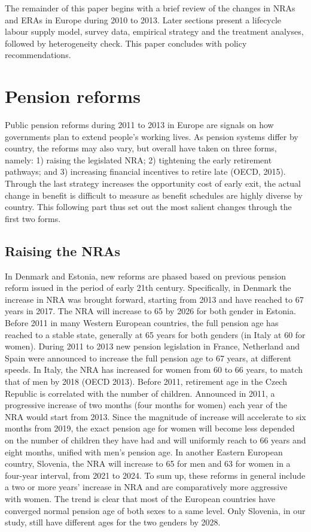 \documentclass[a4paper]{article}
\begin{document}
The remainder of this paper begins with a brief review of the changes in NRAs and ERAs in Europe during 2010 to 2013. Later sections present a lifecycle labour supply model, survey data, empirical strategy and the treatment analyses, followed by heterogeneity check. This paper concludes with policy recommendations. 
\section{Pension reforms}

Public pension reforms during 2011 to 2013 in Europe are signals on how governments plan to extend people’s working lives. As pension systems differ by country, the reforms may also vary, but overall have taken on three forms, namely: 1) raising the legislated NRA; 2) tightening the early retirement pathways; and 3) increasing financial incentives to retire late (OECD, 2015). Through the last strategy increases the opportunity cost of early exit, the actual change in benefit is difficult to measure as benefit schedules are highly diverse by country. This following part thus set out the most salient changes through the first two forms.

  \subsection{Raising the NRAs} 
  
  In Denmark and Estonia, new reforms are phased based on previous pension reform issued in the period of early 21th century. Specifically, in Denmark the increase in NRA was brought forward, starting from 2013 and have reached to 67 years in 2017. The NRA will increase to 65 by 2026 for both gender in Estonia. Before 2011 in many Western European countries, the full pension age has reached to a stable state, generally at 65 years for both genders (in Italy at 60 for women).  During 2011 to 2013 new pension legislation in France, Netherland and Spain were announced to increase the full pension age to 67 years, at different speeds. In Italy, the NRA has increased for women from 60 to 66 years, to match that of men by 2018 (OECD 2013). Before 2011, retirement age in the Czech Republic is correlated with the number of children. Announced in 2011, a progressive increase of two months (four months for women) each year of the NRA would start from 2013. Since the magnitude of increase will accelerate to six months from 2019, the exact pension age for women will become less depended on the number of children they have had and will uniformly reach to 66 years and eight months, unified with men’s pension age. In another Eastern European country, Slovenia, the NRA will increase to 65 for men and 63 for women in a four-year interval, from 2021 to 2024. To sum up, these reforms in general include a two or more years’ increase in NRA and are comparatively more aggressive with women. The trend is clear that most of the European countries have converged normal pension age of both sexes to a same level. Only Slovenia, in our study, still have different ages for the two genders by 2028.  
\end{document}
